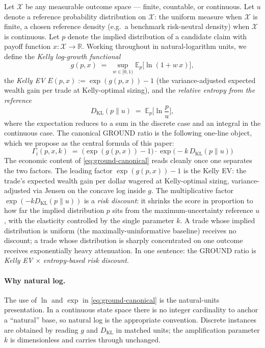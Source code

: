 \documentclass[11pt]{article}
\theoremstyle{definition}
\theoremstyle{remark}
\newcommand{\E}{\mathbb{E}}
\newcommand{\R}{\mathbb{R}}
\newcommand{\G}{g}
\newcommand{\X}{\mathcal{X}}
\newcommand{\KL}{D_{\mathrm{KL}}}
\newcommand{\GROUND}{\Gamma_{\mathrm{i}}}
\begin{document}
Let $\X$ be any measurable outcome space --- finite, countable, or
continuous. Let $u$ denote a reference probability distribution on
$\X$: the uniform measure when $\X$ is finite, a chosen reference
density (e.g.\ a benchmark risk-neutral density) when $\X$ is
continuous. Let $p$ denote the implied distribution of a candidate
claim with payoff function $x: \X \to \R$. Working throughout in
natural-logarithm units, we define the \emph{Kelly log-growth
functional}
\begin{equation}
\G(p, x) \;=\; \sup_{w \in [0, 1)} \E_p\!\bigl[\ln(1 + w \, x)\bigr],
\label{eq:G-canonical}
\end{equation}
the \emph{Kelly EV} $E(p, x) := \exp(\G(p, x)) - 1$ (the
variance-adjusted expected wealth gain per trade at Kelly-optimal
sizing), and the \emph{relative entropy from the reference}
\begin{equation}
\KL(p \| u) \;=\; \E_p\!\biggl[\ln \frac{p}{u}\biggr],
\label{eq:KL-canonical}
\end{equation}
where the expectation reduces to a sum in the discrete case and an
integral in the continuous case. The canonical GROUND ratio is the
following one-line object, which we propose as the central formula
of this paper:
\begin{equation}
\boxed{\;
\GROUND(p, x, k) \;=\; \bigl(\exp(\G(p, x)) - 1\bigr) \cdot \exp\!\bigl( -k \, \KL(p \| u) \bigr)
\;}
\label{eq:ground-canonical}
\end{equation}
The economic content of \eqref{eq:ground-canonical} reads cleanly
once one separates the two factors. The leading factor
$\exp(\G(p,x)) - 1$ is the Kelly EV: the trade's expected wealth gain
per dollar wagered at Kelly-optimal sizing, variance-adjusted via
Jensen on the concave log inside $\G$. The multiplicative factor
$\exp(-k \KL(p \| u))$ is a \emph{risk discount}: it shrinks the score
in proportion to how far the implied distribution $p$ sits from the
maximum-uncertainty reference $u$, with the elasticity controlled by
the single parameter $k$. A trade whose implied distribution is
uniform (the maximally-uninformative baseline) receives no discount; a
trade whose distribution is sharply concentrated on one outcome
receives exponentially heavy attenuation. In one sentence: the GROUND
ratio is \emph{Kelly EV} $\times$ \emph{entropy-based risk discount}.

\paragraph{Why natural log.} The use of $\ln$ and $\exp$ in
\eqref{eq:ground-canonical} is the natural-units presentation. In a
continuous state space there is no integer cardinality to anchor a
``natural'' base, so natural log is the appropriate convention.
Discrete instances are obtained by reading $\G$ and $\KL$ in matched
units; the amplification parameter $k$ is dimensionless and carries
through unchanged.
\end{document}
